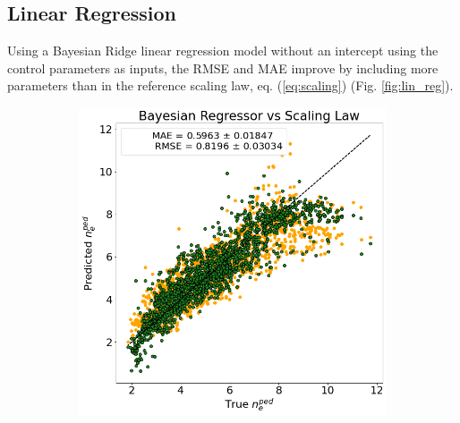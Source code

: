 \documentclass[a4paper, twoside, final, 12pt]{article}
\begin{document}
{\subsection{Linear Regression}

Using a Bayesian Ridge linear regression model without an intercept using the control parameters as inputs, the RMSE and MAE improve by including more parameters than in the reference scaling law, eq. (\ref{eq:scaling}) (Fig. \ref{fig:lin_reg}).
\begin{figure}[hb!]
	\centering
	\begin{subfigure}{0.495\linewidth}
		\centering
		\includegraphics[scale=0.28]{./src/Baysian_regression_predictions}
		\caption{}
		\label{subfig:bayes_pred}
	\end{subfigure}
	\begin{subfigure}{0.495\linewidth}
		\centering

\end{subfigure}
\end{figure}}
\end{document}
